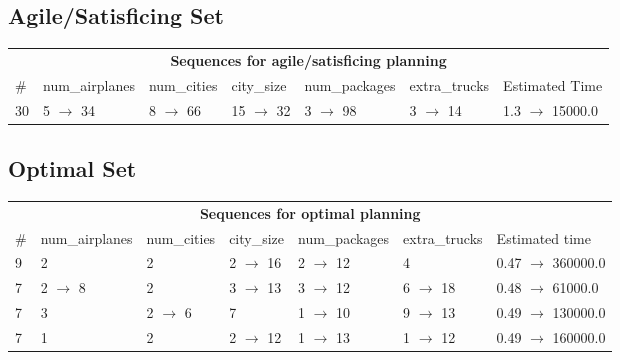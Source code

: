 \documentclass{article}
\begin{document}
                         \subsection*{Agile/Satisficing Set}

                        \begin{center}
                        \begin{tabular}{@{}l|l|l|l|l|l|l@{}}
                        \multicolumn{7}{c}{\bf \large Sequences for agile/satisficing planning}\\
                        \# & num\_airplanes & num\_cities & city\_size & num\_packages & extra\_trucks & Estimated Time\\\midrule
                        30&5 $\rightarrow$ 34&8 $\rightarrow$ 66&15 $\rightarrow$ 32&3 $\rightarrow$ 98&3 $\rightarrow$ 14&1.3 $\rightarrow$ 15000.0
                        \end{tabular}
                        \end{center}
                    
                            \subsection*{Optimal Set}

                            \begin{center}
                            \begin{tabular}{@{}l|l|l|l|l|l|l@{}}
                            \multicolumn{7}{c}{\bf \large Sequences for optimal planning}\\
                            \# & num\_airplanes & num\_cities & city\_size & num\_packages & extra\_trucks & Estimated time\\\midrule
                            9&2&2&2 $\rightarrow$ 16&2 $\rightarrow$ 12&4&0.47 $\rightarrow$ 360000.0\\
7&2 $\rightarrow$ 8&2&3 $\rightarrow$ 13&3 $\rightarrow$ 12&6 $\rightarrow$ 18&0.48 $\rightarrow$ 61000.0\\
7&3&2 $\rightarrow$ 6&7&1 $\rightarrow$ 10&9 $\rightarrow$ 13&0.49 $\rightarrow$ 130000.0\\
7&1&2&2 $\rightarrow$ 12&1 $\rightarrow$ 13&1 $\rightarrow$ 12&0.49 $\rightarrow$ 160000.0
                            \end{tabular}
                            \end{center}
                    
\end{document}
